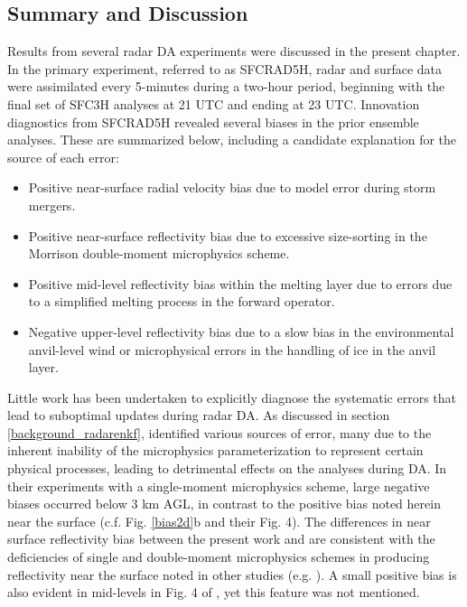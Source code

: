 \subsection{Summary and Discussion}
Results from several radar DA experiments were discussed in the present chapter. In the primary experiment, referred to as SFCRAD5H, radar and surface data were assimilated every 5-minutes during a two-hour period, beginning with the final set of SFC3H analyses at 21 UTC and ending at 23 UTC. Innovation diagnostics from SFCRAD5H revealed several biases in the prior ensemble analyses. These are summarized below, including a candidate explanation for the source of each error:

\begin{itemize}
\item Positive near-surface radial velocity bias due to model error during storm mergers.
\item Positive near-surface reflectivity bias due to excessive size-sorting in the Morrison double-moment microphysics scheme.
\item Positive mid-level reflectivity bias within the melting layer due to errors due to a simplified melting process in the forward operator.
\item Negative upper-level reflectivity bias due to a slow bias in the environmental anvil-level wind or microphysical errors in the handling of ice in the anvil layer.
\end{itemize}

Little work has been undertaken to explicitly diagnose the systematic errors that lead to suboptimal updates during radar DA. As discussed in section \ref{background_radarenkf}, \citet{dowelletal11} identified various sources of error, many due to the inherent inability of the microphysics parameterization to represent certain physical processes, leading to detrimental effects on the analyses during DA. In their experiments with a single-moment microphysics scheme, large negative biases occurred below 3 km AGL, in contrast to the positive bias noted herein near the surface (c.f. Fig. \ref{bias2d}b and their Fig. 4). The differences in near surface reflectivity bias between the present work and \citet{dowelletal11} are consistent with the deficiencies of single and double-moment microphysics schemes in producing reflectivity near the surface noted in other studies (e.g. \citealt{dawsonetal10,kumjianryzhkov12}). A small positive bias is also evident in mid-levels in Fig. 4 of \citet{dowelletal11}, yet this feature was not mentioned.

